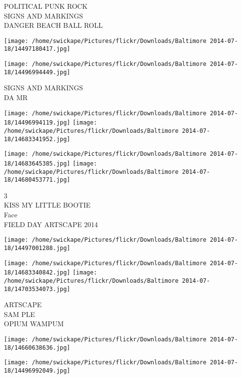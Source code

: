 \documentclass[10pt,letterpaper]{article}
\begin{document}
POLITICAL PUNK ROCK\\
SIGNS AND MARKINGS\\
DANGER BEACH BALL ROLL\\
\pagebreak

\texttt{[image: /home/swickape/Pictures/flickr/Downloads/Baltimore 2014-07-18/14497180417.jpg]}

\vspace{0.25in}
\texttt{[image: /home/swickape/Pictures/flickr/Downloads/Baltimore 2014-07-18/14496994449.jpg]}

SIGNS AND MARKINGS\\
DA MR\\
\pagebreak

\texttt{[image: /home/swickape/Pictures/flickr/Downloads/Baltimore 2014-07-18/14496994119.jpg]}
\texttt{[image: /home/swickape/Pictures/flickr/Downloads/Baltimore 2014-07-18/14683341952.jpg]}

\texttt{[image: /home/swickape/Pictures/flickr/Downloads/Baltimore 2014-07-18/14683645385.jpg]}
\texttt{[image: /home/swickape/Pictures/flickr/Downloads/Baltimore 2014-07-18/14680453771.jpg]}

3\\
KISS MY LITTLE BOOTIE\\
Face\\
FIELD DAY ARTSCAPE 2014\\
\pagebreak

\texttt{[image: /home/swickape/Pictures/flickr/Downloads/Baltimore 2014-07-18/14497001288.jpg]}

\vspace{0.25in}
\texttt{[image: /home/swickape/Pictures/flickr/Downloads/Baltimore 2014-07-18/14683340842.jpg]}
\texttt{[image: /home/swickape/Pictures/flickr/Downloads/Baltimore 2014-07-18/14703534073.jpg]}

ARTSCAPE\\
SAM PLE\\
OPIUM WAMPUM\\
\pagebreak

\texttt{[image: /home/swickape/Pictures/flickr/Downloads/Baltimore 2014-07-18/14660638636.jpg]}

\vspace{0.25in}
\texttt{[image: /home/swickape/Pictures/flickr/Downloads/Baltimore 2014-07-18/14496992049.jpg]}
\end{document}
